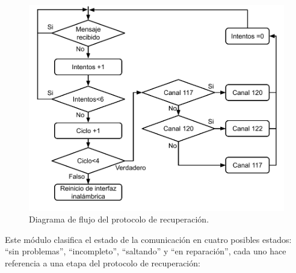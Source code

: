 \begin{figure}[]
	\centering
	\includegraphics[scale=.35]{./Figures/Capitulo3/Fig_O3.png}
	\caption{Diagrama de flujo del protocolo de recuperación.}
	\label{fig:figura_o3}
\end{figure}  

Este módulo clasifica el estado de la comunicación en cuatro posibles estados: ``sin problemas'',  ``incompleto'',  ``saltando'' y  ``en reparación'', cada uno hace referencia a una etapa del protocolo de recuperación:  

